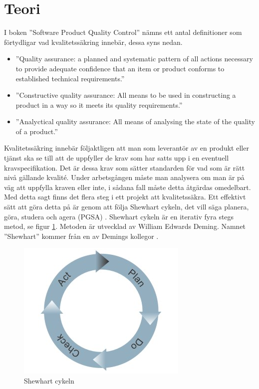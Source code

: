 \section{Teori}
I boken ''Software Product Quality Control'' \citep{SPQC} nämns ett antal definitioner som förtydligar vad kvalitetssäkring innebär, dessa syns nedan.  

\begin{itemize}
  \item ''Quality assurance: a planned and systematic pattern of all actions necessary to provide adequate confidence that an item or product conforms to established technical requirements.'' \citep[p.19]{SPQC} 
  \item ''Constructive quality assurance: All means to be used in constructing a product in a way so it meets its quality requirements.'' \citep[p.19]{SPQC} 
  \item ''Analyctical quality assurance: All means of analysing the state of the quality of a product.'' \citep[p.19]{SPQC} 
\end{itemize}
\noindent Kvalitetssäkring innebär följaktligen att man som leverantör av en produkt eller tjänst ska se till att de uppfyller de krav som har satts upp i en eventuell kravspecifikation. Det är dessa krav som sätter standarden för vad som är rätt nivå gällande kvalité. Under arbetsgången måste man analysera om man är på väg att uppfylla kraven eller inte, i sådana fall måste detta åtgärdas omedelbart.
\newline
\newline
Med detta sagt finns det flera steg i ett projekt att kvalitetssäkra. Ett effektivt sätt att göra detta på är genom att följa Shewhart cykeln, det vill säga planera, göra, studera och agera (PGSA) \citep{PDCA}. Shewhart cykeln är en iterativ fyra stegs metod, se figur \ref{fig:shewcycle}. Metoden är utvecklad av William Edwards Deming. Namnet ''Shewhart'' kommer från en av Demings kollegor \citep[p.~88]{Deming}. 
\begin{figure}[h]
\centerline{\includegraphics[scale=0.5]{ruben-tex/graphic/shewhartcycle}}
\caption{Shewhart cykeln \citep{Mindtools}}
\label{fig:shewcycle}
\end{figure}
